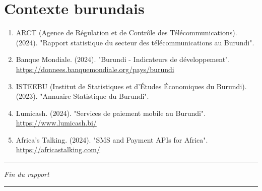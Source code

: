 \section{Contexte burundais}

\begin{enumerate}
    \item ARCT (Agence de Régulation et de Contrôle des Télécommunications). (2024). "Rapport statistique du secteur des télécommunications au Burundi".

    \item Banque Mondiale. (2024). "Burundi - Indicateurs de développement". \\
    \url{https://donnees.banquemondiale.org/pays/burundi}

    \item ISTEEBU (Institut de Statistiques et d'Études Économiques du Burundi). (2023). "Annuaire Statistique du Burundi".

    \item Lumicash. (2024). "Services de paiement mobile au Burundi". \\
    \url{https://www.lumicash.bi/}

    \item Africa's Talking. (2024). "SMS and Payment APIs for Africa". \\
    \url{https://africastalking.com/}
\end{enumerate}

\vspace{2cm}

\begin{center}
\rule{0.5\textwidth}{0.4pt}

\textit{Fin du rapport}

\rule{0.5\textwidth}{0.4pt}
\end{center}


